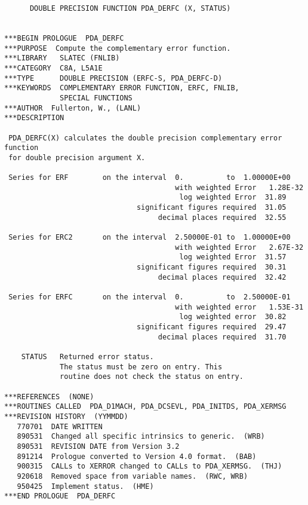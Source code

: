 \begin{verbatim}
      DOUBLE PRECISION FUNCTION PDA_DERFC (X, STATUS)


***BEGIN PROLOGUE  PDA_DERFC
***PURPOSE  Compute the complementary error function.
***LIBRARY   SLATEC (FNLIB)
***CATEGORY  C8A, L5A1E
***TYPE      DOUBLE PRECISION (ERFC-S, PDA_DERFC-D)
***KEYWORDS  COMPLEMENTARY ERROR FUNCTION, ERFC, FNLIB,
             SPECIAL FUNCTIONS
***AUTHOR  Fullerton, W., (LANL)
***DESCRIPTION

 PDA_DERFC(X) calculates the double precision complementary error function
 for double precision argument X.

 Series for ERF        on the interval  0.          to  1.00000E+00
                                        with weighted Error   1.28E-32
                                         log weighted Error  31.89
                               significant figures required  31.05
                                    decimal places required  32.55

 Series for ERC2       on the interval  2.50000E-01 to  1.00000E+00
                                        with weighted Error   2.67E-32
                                         log weighted Error  31.57
                               significant figures required  30.31
                                    decimal places required  32.42

 Series for ERFC       on the interval  0.          to  2.50000E-01
                                        with weighted error   1.53E-31
                                         log weighted error  30.82
                               significant figures required  29.47
                                    decimal places required  31.70

    STATUS   Returned error status.
             The status must be zero on entry. This
             routine does not check the status on entry.

***REFERENCES  (NONE)
***ROUTINES CALLED  PDA_D1MACH, PDA_DCSEVL, PDA_INITDS, PDA_XERMSG
***REVISION HISTORY  (YYMMDD)
   770701  DATE WRITTEN
   890531  Changed all specific intrinsics to generic.  (WRB)
   890531  REVISION DATE from Version 3.2
   891214  Prologue converted to Version 4.0 format.  (BAB)
   900315  CALLs to XERROR changed to CALLs to PDA_XERMSG.  (THJ)
   920618  Removed space from variable names.  (RWC, WRB)
   950425  Implement status.  (HME)
***END PROLOGUE  PDA_DERFC
\end{verbatim}


